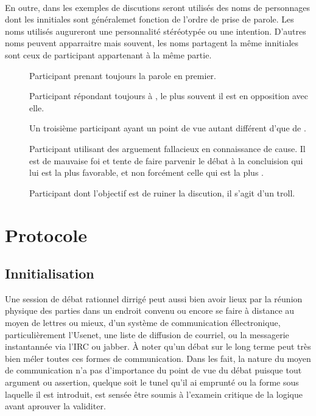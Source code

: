 \paragraph{}
En outre, dans les exemples de discutions seront utilisés des noms de personnages dont les innitiales sont généralemet fonction de l’ordre de prise de parole. Les noms utilisés augureront une personnalité stéréotypée ou une intention. D’autres noms peuvent apparraitre mais souvent, les noms partagent la même innitiales sont ceux de participant appartenant à la même partie.

\begin{description}
  \item[\A] Participant prenant toujours la parole en premier.
  \item[\B] Participant répondant toujours à \A, le plus souvent il est en opposition avec elle.
  \item[\C] Un troisième participant ayant un point de vue autant différent d’\A que de \B.
  \item[\Sophist] Participant utilisant des arguement fallacieux en connaissance de cause. Il est de mauvaise foi et tente de faire parvenir le débat à la concluision qui lui est la plus favorable, et non forcément celle qui est la plus .
  \item[\Troll] Participant dont l’objectif est de ruiner la discution, il s’agit d’un troll.
\end{description}

\section{Protocole}
\subsection{Innitialisation}
Une session de débat rationnel dirrigé peut aussi bien avoir lieux par la réunion physique des parties dans un endroit convenu ou encore se faire à distance au moyen de lettres ou mieux, d’un système de communication éllectronique, particulièrement l’Usenet, une liste de diffusion de courriel, ou la messagerie instantannée via l’IRC ou jabber. À noter qu’un débat sur le long terme peut très bien méler toutes ces formes de communication. Dans les fait, la nature du moyen de communication n’a pas d’importance du point de vue du débat puisque tout argument ou assertion, quelque soit le tunel qu’il ai emprunté ou la forme sous laquelle il est introduit, est sensée être soumis à l’examein critique de la logique avant aprouver la validiter.

